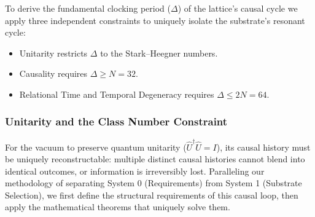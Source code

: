 To derive the fundamental clocking period ($\Delta$) of the lattice's causal cycle we apply three independent constraints to uniquely isolate the substrate's resonant cycle:

\begin{itemize}
    \item Unitarity restricts $\Delta$ to the Stark--Heegner numbers.
    \item Causality requires $\Delta \geq N = 32$.
    \item Relational Time and Temporal Degeneracy requires $\Delta \leq 2N = 64$.
\end{itemize}

\subsubsection{Unitarity and the Class Number Constraint}
\label{sec:fundamental_resonance_filter1}
For the vacuum to preserve quantum unitarity ($\hat{U}^\dagger\hat{U} = I$), its causal history must be uniquely reconstructable: multiple distinct causal histories cannot blend into identical outcomes, or information is irreversibly lost. Paralleling our methodology of separating System 0 (Requirements) from System 1 (Substrate Selection), we first define the structural requirements of this causal loop, then apply the mathematical theorems that uniquely solve them.

